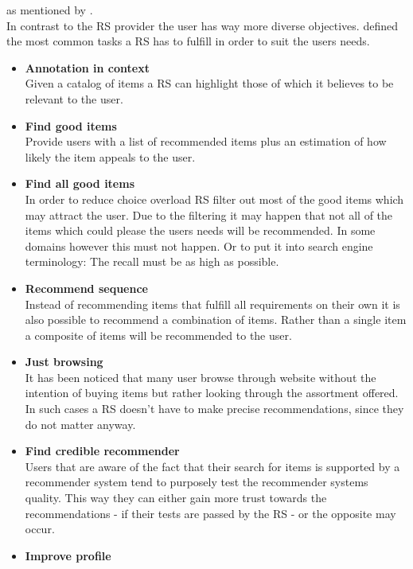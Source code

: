 as mentioned by \citeauthor{ricci:2011}.\citep[p.~4-5]{ricci:2011}
\\

In contrast to the RS provider the user has way more diverse objectives.
\citeauthor{herlocker:2004} defined the most common tasks a RS has to fulfill in order to suit the users needs.
\begin{itemize}
    \item\textbf{Annotation in context}\hfill\\
        Given a catalog of items a RS can highlight those of which it believes to be relevant to the user.
    \item\textbf{Find good items}\hfill\\
        Provide users with a list of recommended items plus an estimation of how likely the item appeals to the user.
    \item\textbf{Find all good items}\hfill\\
        In order to reduce choice overload RS filter out most of the good items which may attract the user.
        Due to the filtering it may happen that not all of the items which could please the users needs will be recommended.
        In some domains however this must not happen.
        Or to put it into search engine terminology: The recall must be as high as possible.
    \item\textbf{Recommend sequence}\hfill\\
        Instead of recommending items that fulfill all requirements on their own it is also possible to recommend a combination of items.
        Rather than a single item a composite of items will be recommended to the user.
    \item\textbf{Just browsing}\hfill\\
        It has been noticed that many user browse through website without the intention of buying items but rather looking through the assortment offered.
        In such cases a RS doesn't have to make precise recommendations, since they do not matter anyway.
    \item\textbf{Find credible recommender}\hfill\\
        Users that are aware of the fact that their search for items is supported by a recommender system tend to purposely test the recommender systems quality.
        This way they can either gain more trust towards the recommendations - if their tests are passed by the RS - or the opposite may occur.
    \item\textbf{Improve profile}\hfill\\

\end{itemize}
